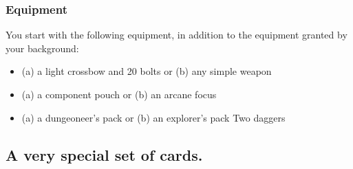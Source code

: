 \subsubsection{Equipment}
You start with the following equipment, in addition to
the equipment granted by your background:
\begin{itemize}
	\item (a) a light crossbow and 20 bolts or (b) any simple weapon
	\item (a) a component pouch or (b) an arcane focus
	\item (a) a dungeoneer's pack or (b) an explorer's pack Two daggers
\end{itemize}

\subsection{A very special set of cards.}

